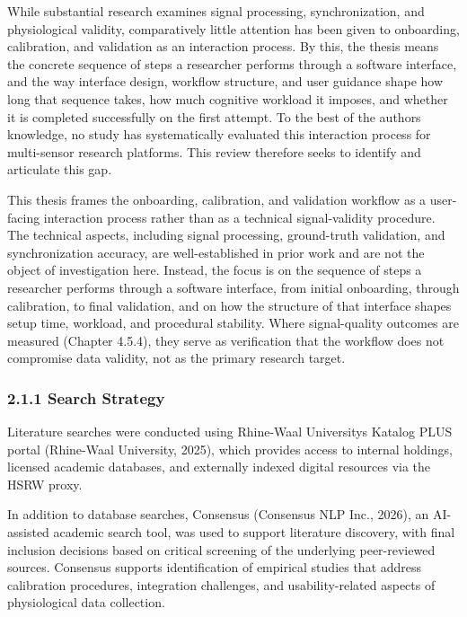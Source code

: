 \documentclass[
]{article}
\begin{document}
While substantial research examines signal processing, synchronization, and physiological validity, comparatively little attention has been given to onboarding, calibration, and validation as an interaction process. By this, the thesis means the concrete sequence of steps a researcher performs through a software interface, and the way interface design, workflow structure, and user guidance shape how long that sequence takes, how much cognitive workload it imposes, and whether it is completed successfully on the first attempt. To the best of the author\textquotesingle s knowledge, no study has systematically evaluated this interaction process for multi-sensor research platforms. This review therefore seeks to identify and articulate this gap.

This thesis frames the onboarding, calibration, and validation workflow as a user-facing interaction process rather than as a technical signal-validity procedure. The technical aspects, including signal processing, ground-truth validation, and synchronization accuracy, are well-established in prior work and are not the object of investigation here. Instead, the focus is on the sequence of steps a researcher performs through a software interface, from initial onboarding, through calibration, to final validation, and on how the structure of that interface shapes setup time, workload, and procedural stability. Where signal-quality outcomes are measured (Chapter 4.5.4), they serve as verification that the workflow does not compromise data validity, not as the primary research target.

\hypertarget{search-strategy}{%
\subsubsection{2.1.1 Search Strategy}\label{search-strategy}}

Literature searches were conducted using Rhine-Waal University\textquotesingle s Katalog PLUS portal (Rhine-Waal University, 2025), which provides access to internal holdings, licensed academic databases, and externally indexed digital resources via the HSRW proxy.

In addition to database searches, Consensus (Consensus NLP Inc., 2026), an AI-assisted academic search tool, was used to support literature discovery, with final inclusion decisions based on critical screening of the underlying peer-reviewed sources. Consensus supports identification of empirical studies that address calibration procedures, integration challenges, and usability-related aspects of physiological data collection.
\end{document}
